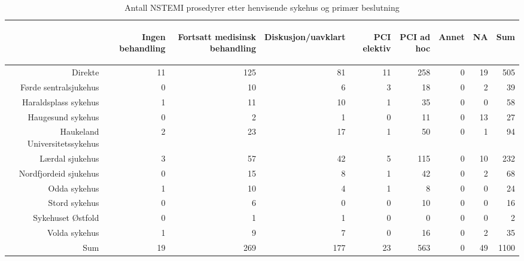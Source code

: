 \documentclass[presentation,xcolor=pdftex,dvipsnames,table]{beamer}
\begin{document}
\begin{frame}
\begin{tiny}
\begin{table}[ht]
\centering
\begin{tabular}{rrrrrrrrr}
  \toprule
 & \begin{sideways} Ingen behandling \end{sideways} & \begin{sideways} Fortsatt medisinsk behandling \end{sideways} & \begin{sideways} Diskusjon/uavklart \end{sideways} & \begin{sideways} PCI elektiv \end{sideways} & \begin{sideways} PCI ad hoc \end{sideways} & \begin{sideways} Annet \end{sideways} & \begin{sideways} NA \end{sideways} & \begin{sideways} Sum \end{sideways} \\ 
  \midrule
Direkte & 11 & 125 & 81 & 11 & 258 & 0 & 19 & 505 \\ 
  Førde sentralsjukehus & 0 & 10 & 6 & 3 & 18 & 0 & 2 & 39 \\ 
  Haraldsplass sykehus & 1 & 11 & 10 & 1 & 35 & 0 & 0 & 58 \\ 
  Haugesund sykehus & 0 & 2 & 1 & 0 & 11 & 0 & 13 & 27 \\ 
  Haukeland Universitetssykehus & 2 & 23 & 17 & 1 & 50 & 0 & 1 & 94 \\ 
  Lærdal sjukehus & 3 & 57 & 42 & 5 & 115 & 0 & 10 & 232 \\ 
  Nordfjordeid sjukehus & 0 & 15 & 8 & 1 & 42 & 0 & 2 & 68 \\ 
  Odda sykehus & 1 & 10 & 4 & 1 & 8 & 0 & 0 & 24 \\ 
  Stord sykehus & 0 & 6 & 0 & 0 & 10 & 0 & 0 & 16 \\ 
  Sykehuset Østfold & 0 & 1 & 1 & 0 & 0 & 0 & 0 & 2 \\ 
  Volda sykehus & 1 & 9 & 7 & 0 & 16 & 0 & 2 & 35 \\ 
  Sum & 19 & 269 & 177 & 23 & 563 & 0 & 49 & 1100 \\ 
   \bottomrule
\end{tabular}
\caption{Antall NSTEMI prosedyrer etter henvisende sykehus og primær beslutning} 
\end{table}\end{tiny}
\end{frame}
\end{document}
